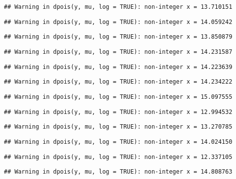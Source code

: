 \documentclass[
]{article}
\begin{document}
\begin{verbatim}
## Warning in dpois(y, mu, log = TRUE): non-integer x = 13.710151
\end{verbatim}

\begin{verbatim}
## Warning in dpois(y, mu, log = TRUE): non-integer x = 14.059242
\end{verbatim}

\begin{verbatim}
## Warning in dpois(y, mu, log = TRUE): non-integer x = 13.850879
\end{verbatim}

\begin{verbatim}
## Warning in dpois(y, mu, log = TRUE): non-integer x = 14.231587
\end{verbatim}

\begin{verbatim}
## Warning in dpois(y, mu, log = TRUE): non-integer x = 14.223639
\end{verbatim}

\begin{verbatim}
## Warning in dpois(y, mu, log = TRUE): non-integer x = 14.234222
\end{verbatim}

\begin{verbatim}
## Warning in dpois(y, mu, log = TRUE): non-integer x = 15.097555
\end{verbatim}

\begin{verbatim}
## Warning in dpois(y, mu, log = TRUE): non-integer x = 12.994532
\end{verbatim}

\begin{verbatim}
## Warning in dpois(y, mu, log = TRUE): non-integer x = 13.270785
\end{verbatim}

\begin{verbatim}
## Warning in dpois(y, mu, log = TRUE): non-integer x = 14.024150
\end{verbatim}

\begin{verbatim}
## Warning in dpois(y, mu, log = TRUE): non-integer x = 12.337105
\end{verbatim}

\begin{verbatim}
## Warning in dpois(y, mu, log = TRUE): non-integer x = 14.808763
\end{verbatim}
\end{document}
